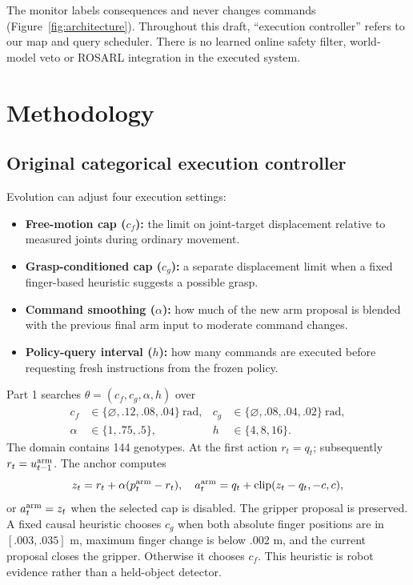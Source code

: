\documentclass[sigconf,dvipsnames]{acmart}
\newcommand{\disabled}{\varnothing}
\begin{document}
The monitor labels consequences and never changes commands
(Figure~\ref{fig:architecture}). Throughout this draft, ``execution controller''
refers to our map and query scheduler. There is no learned online safety filter,
world-model veto or ROSARL integration in the executed system.

\section{Methodology}
\subsection{Original categorical execution controller}
Evolution can adjust four execution settings:
\begin{itemize}
 \item \textbf{Free-motion cap ($c_f$):} the limit on joint-target displacement
 relative to measured joints during ordinary movement.
 \item \textbf{Grasp-conditioned cap ($c_g$):} a separate displacement limit when
 a fixed finger-based heuristic suggests a possible grasp.
 \item \textbf{Command smoothing ($\alpha$):} how much of the new arm proposal is
 blended with the previous final arm input to moderate command changes.
 \item \textbf{Policy-query interval ($h$):} how many commands are executed before
 requesting fresh instructions from the frozen policy.
\end{itemize}
Part 1 searches $\theta=(c_f,c_g,\alpha,h)$ over
\begin{align}
 c_f&\in\{\disabled,.12,.08,.04\}\ \mathrm{rad}, &
 c_g&\in\{\disabled,.08,.04,.02\}\ \mathrm{rad},\nonumber\\
 \alpha&\in\{1,.75,.5\}, &h&\in\{4,8,16\}.
\end{align}
The domain contains 144 genotypes. At the first action $r_t=q_t$; subsequently
$r_t=u_{t-1}^{\rm arm}$. The anchor computes
\begin{equation}
 z_t=r_t+\alpha(p_t^{\rm arm}-r_t),\quad
 a_t^{\rm arm}=q_t+\operatorname{clip}(z_t-q_t,-c,c),
 \label{eq:component}
\end{equation}
or $a_t^{\rm arm}=z_t$ when the selected cap is disabled. The gripper proposal is
preserved. A fixed causal heuristic chooses $c_g$ when both absolute finger positions
are in $[.003,.035]$ m, maximum finger change is below .002 m, and the current proposal
closes the gripper. Otherwise it chooses $c_f$. This heuristic is robot evidence
rather than a held-object detector.
\end{document}
